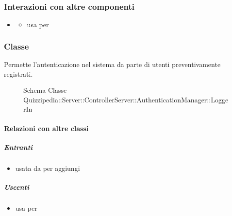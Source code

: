 \subsubsection{Interazioni con altre componenti}
\begin{itemize}
\item {}
\begin{itemize}
\item usa  per 
\end{itemize}
\end{itemize}
\subsubsection{Classe }
Permette l'autenticazione nel sistema da parte di utenti preventivamente registrati.
\begin{figure}[H]
\centering
\noindent{}
\caption[Schema Classe LoggerIn]{Schema Classe Quizzipedia::Server::ControllerServer::AuthenticationManager::LoggerIn}
\end{figure}
\paragraph{Relazioni con altre classi}
\subparagraph{Entranti}
\begin{itemize}
\item usata da  per aggiungi
\end{itemize}
\subparagraph{Uscenti}
\begin{itemize}
\item usa  per 
\end{itemize}
